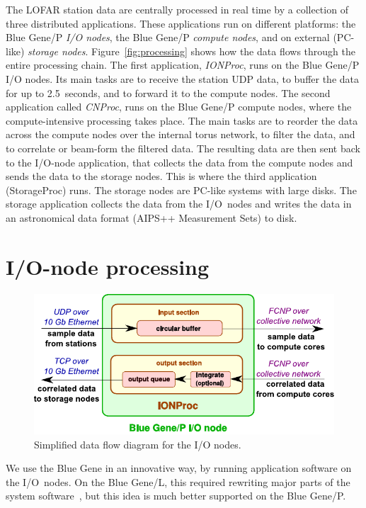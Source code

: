 \documentclass{sig-alternate}
\begin{document}
The LOFAR station data are centrally processed in real time by a collection
of three distributed applications.
These applications run on different platforms:
the Blue Gene/P \emph{I/O nodes}, the Blue Gene/P \emph{compute nodes}, and on
external (PC-like) \emph{storage nodes}.
Figure~\ref{fig:processing} shows how the data flows through the entire
processing chain.
The first application, \emph{IONProc}, runs on the Blue Gene/P I/O nodes.
Its main tasks are to receive the station UDP data, to buffer the data
for up to 2.5~seconds, and to forward it to the compute nodes.
The second application called \emph{CNProc}, runs on the Blue Gene/P compute nodes, where the
compute-intensive processing takes place.
The main tasks are to reorder the data across the compute nodes over the
internal torus network, to filter the data, and to correlate or beam-form
the filtered data.
The resulting data are then sent back to the I/O-node application, that
collects the data from the compute nodes and
sends the data to the storage nodes.
This is where the third application (StorageProc) runs.
The storage nodes are PC-like systems with large disks.
The storage application collects the data from the I/O~nodes and writes the
data in an astronomical data format (AIPS++ Measurement Sets) to disk.


\section{I/O-node processing}
\label{sec:IONProc}

\begin{figure}[ht]
\includegraphics[width=\columnwidth]{ION-processing.pdf}
\caption{Simplified data flow diagram for the I/O nodes.}
\label{fig:ion-processing}
\end{figure}

We use the Blue Gene in an innovative way, by running application software
on the I/O~nodes.
On the Blue Gene/L, this required rewriting major parts of the system
software~\cite{Iskra:08}, but this idea is much better supported on the
Blue Gene/P.
\end{document}

